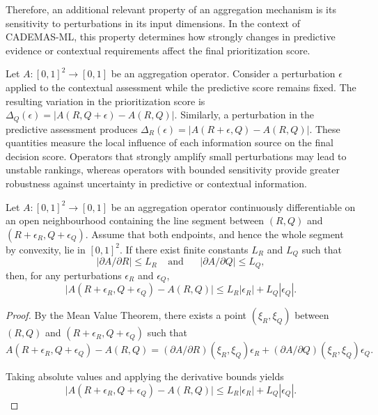 \documentclass[mathematics,article,submit,moreauthors]{Definitions/mdpi}
\begin{document}
Therefore, an additional relevant property of an aggregation mechanism
is its sensitivity to perturbations in its input dimensions. In the
context of CADEMAS-ML, this property determines how strongly changes in
predictive evidence or contextual requirements affect the final
prioritization score.

Let $A:[0,1]^2\rightarrow[0,1]$ be an aggregation operator. Consider a
perturbation $\epsilon$ applied to the contextual assessment while the
predictive score remains fixed. The resulting variation in the
prioritization score is
$\Delta_Q(\epsilon)=\bigl|A(R,Q+\epsilon)-A(R,Q)\bigr|$.
Similarly, a perturbation in the predictive assessment produces
$\Delta_R(\epsilon)=\bigl|A(R+\epsilon,Q)-A(R,Q)\bigr|$.
These quantities measure the local influence of each information source
on the final decision score. Operators that strongly amplify small
perturbations may lead to unstable rankings, whereas operators with
bounded sensitivity provide greater robustness against uncertainty in
predictive or contextual information.

\begin{Theorem}
\label{thm:lipschitz-sensitivity}
Let $A:[0,1]^2\rightarrow[0,1]$ be an aggregation operator continuously
differentiable on an open neighbourhood containing the line segment between
$(R,Q)$ and $(R+\epsilon_R,Q+\epsilon_Q)$. {\color{blue}Assume that both
endpoints, and hence the whole segment by convexity, lie in \([0,1]^2\).}
If there exist finite constants $L_R$ and $L_Q$ such that
\begin{equation*}
\bigl|\partial A/\partial R\bigr|\leq L_R \;\;\;\;\text{and}\;\;\;\;\;\; 
\bigl|\partial A/\partial Q\bigr|\leq L_Q,
\end{equation*}
then, for any perturbations $\epsilon_R$ and $\epsilon_Q$,
\begin{equation*}
\bigl|A(R+\epsilon_R,Q+\epsilon_Q)-A(R,Q)\bigr|
\leq L_R|\epsilon_R|+L_Q|\epsilon_Q|.
\end{equation*}
\end{Theorem}

\begin{proof}
By the Mean Value Theorem, there exists a point
$(\xi_R,\xi_Q)$ between $(R,Q)$ and
$(R+\epsilon_R,Q+\epsilon_Q)$ such that
\begin{equation*}
A(R+\epsilon_R,Q+\epsilon_Q)-A(R,Q)
=
(\partial A/\partial R)(\xi_R,\xi_Q)\epsilon_R
+
(\partial A/\partial Q)(\xi_R,\xi_Q)\epsilon_Q.
\end{equation*}

Taking absolute values and applying the derivative bounds yields
\begin{equation*}
\bigl|A(R+\epsilon_R,Q+\epsilon_Q)-A(R,Q)\bigr|
\leq L_R|\epsilon_R|+L_Q|\epsilon_Q|.
\end{equation*}
\end{proof}
\end{document}
